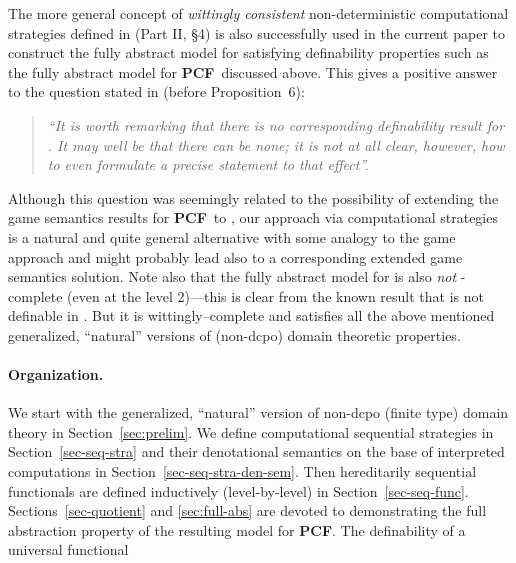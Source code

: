 \documentclass[fleqn]{LMCS}
\theoremstyle{plain}\newtheorem{satz}[thm]{Satz}
\theoremstyle{plain}\newtheorem{hyp}[thm]{Hypothesis}
\theoremstyle{plain}\newtheorem{hyps}[thm]{Hypotheses}
\theoremstyle{definition}\newtheorem{note}[thm]{Note}
\newcommand{\PCF}{\mbox{\bf PCF}}
\newcommand{\?}{\mbox{?}}
\begin{document}
The more general concept of \emph{wittingly consistent} 
non-deterministic computational 
stra\-tegies defined in 
\cite{Saz76t} (Part II, \S 4) is also successfully used in the current 
paper to 
construct the fully abstract model  
for  satisfying  
definability properties such as  
the fully abstract model  
for \PCF\ discussed above. 
This gives a positive answer to the question 
stated in \cite{Longley-Plotkin} 
(before Proposition~6): 
\begin{quote}
\emph{``It is worth remarking that 
there is no corresponding definability result for . 
It may well be that there can be none; it is not at all clear, however, 
how to even formulate a precise statement to that effect''.}
\end{quote}
Although this question was seemingly related to the possibility 
of extending the game semantics results for \PCF\ to , 
our approach via computational 
strategies is a natural and quite general alternative 
with some analogy to the game approach and might probably 
lead also to a corresponding extended game semantics solution. 
Note also that the fully abstract model  
for  is also 
\emph{not} -complete (even at the level 2)---this is clear from the known 
result that  is not definable in . 
But it is wittingly--complete 
and satisfies all the above mentioned generalized, ``natural'' 
versions of (non-dcpo) domain theoretic properties. 


\paragraph*{\bf Organization.} 
We start with the generalized, ``natural'' version of non-dcpo 
(finite type) domain theory 
in Section~\ref{sec:prelim}. 
We define computational sequential strategies 
in Section~\ref{sec-seq-stra} and their denotational semantics 
on the base of interpreted computations in Section~\ref{sec-seq-stra-den-sem}. 
Then hereditarily 
sequential functionals are defined inductively (level-by-level) 
in Section~\ref{sec-seq-func}.  
Sections~\ref{sec-quotient} and \ref{sec:full-abs} are devoted to 
demonstrating 
the full abstraction property of the resulting model  for \PCF. 
The definability of a universal functional 
\end{document}
